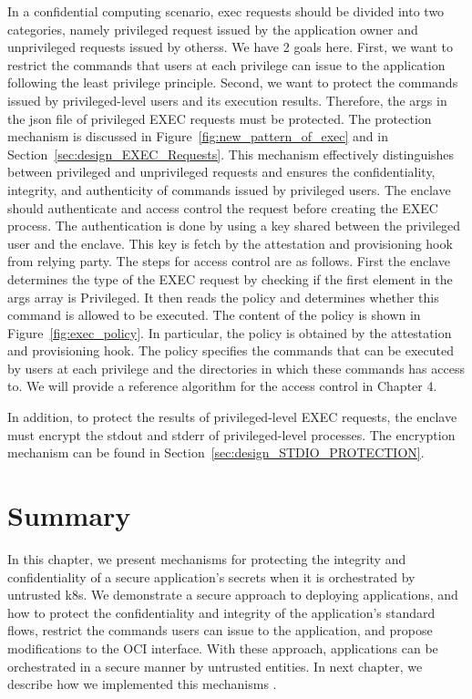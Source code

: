   In a confidential computing scenario, exec requests should be divided into two categories, namely privileged  request issued by the application owner and unprivileged requests issued by otherss. We have 2 goals here. First, we want to restrict 
  the commands that users at each privilege can issue to the application following the least privilege principle. Second, we want to protect the commands issued by privileged-level users and its execution results. Therefore, the args in the json file 
  of privileged EXEC requests must be protected. The protection mechanism is discussed in Figure~\ref{fig:new_pattern_of_exec} and in Section~\ref{sec:design_EXEC_Requests}. This mechanism effectively distinguishes between privileged and unprivileged requests and ensures the confidentiality, integrity, 
  and authenticity of commands issued by privileged users. The enclave should authenticate and access control the request before creating the EXEC process. The authentication is done by using a key shared between the privileged user and the enclave. 
  This key is fetch by the attestation and provisioning hook from relying party. The steps for access control are as follows. First the enclave determines the type of the EXEC request by checking if the first element in the args array is Privileged. 
  It then reads the policy and determines whether this command is allowed to be executed. The content of the policy is shown in Figure~\ref{fig:exec_policy}. In particular, the policy is  obtained by the attestation and provisioning hook.  
  The policy specifies the commands that can be executed by users at each privilege and the directories in which these commands has access to. We will provide a reference algorithm for the access control in Chapter 4.

  In addition, to protect the results of privileged-level EXEC requests, the enclave must encrypt the stdout and stderr of privileged-level processes. The encryption mechanism can be found in Section~\ref{sec:design_STDIO_PROTECTION}.
  

\section{Summary}
In this chapter, we present mechanisms for protecting the integrity and confidentiality of a secure application's secrets when it is orchestrated by untrusted k8s. We demonstrate a secure approach to deploying applications, and how to protect 
the confidentiality and integrity of the application's standard flows, restrict the commands users can issue to the application, and propose modifications to the OCI interface. With these approach, applications can be orchestrated in a secure 
manner by untrusted entities. In next chapter, we describe how we implemented this mechanisms .
\cleardoublepage

